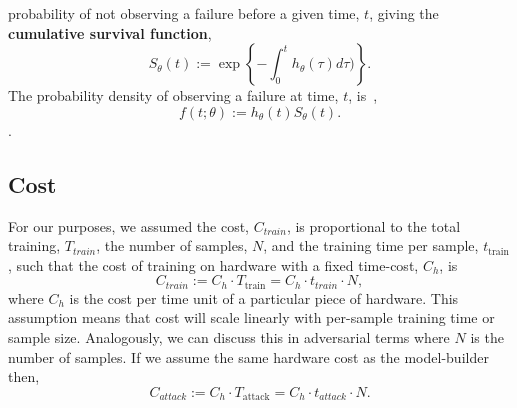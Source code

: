probability of not observing a failure before a given time, $t$, giving the \textbf{cumulative survival function},
\begin{equation}
    S_{\theta}(t) := \exp \left\{- \int_0^{t} h_{\theta}(\tau) d\tau) \right\}.
\label{eq:cdf}
\end{equation}
The probability density of observing a failure at time, $t$, is~\cite{kleinbaum1996survival},
\begin{equation*}
    f(t; \theta) := h_{\theta}(t)S_{\theta}(t).
    \label{eq:pdf}
\end{equation*}
.


\subsection{Cost}

\label{cost}
For our purposes, we assumed the cost, $C_{train}$, is proportional to the total training, $T_{train}$, the number of samples, $N$,  and the training time per sample, $t_{\mathrm{train}}$, such that the cost of training on hardware with a fixed time-cost, $C_h$, is
\[
    C_{train} := C_{h} \cdot T_{\mathrm{train}} = C_h \cdot t_{train} \cdot N,
\]
where $C_h$ is the cost per time unit of a particular piece of hardware. This assumption means that cost will scale linearly with per-sample training time or sample size. Analogously, we can discuss this in adversarial terms where $N$ is the number of samples. If we assume the same hardware cost as the model-builder then,
$$
    C_{attack} := C_{h} \cdot T_{\mathrm{attack}} = C_h \cdot t_{attack} \cdot N.
$$

